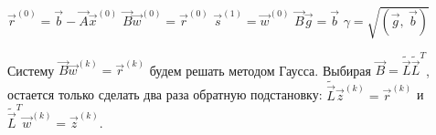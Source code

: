 \begin{algorithm*}[H]
    \DontPrintSemicolon

    $\vec{r}^{(0)} = \vec{b} - \vec{A} \vec{x}^{(0)}$\;
    $\vec{B} \vec{w}^{(0)} = \vec{r}^{(0)}$\;
    $\vec{s}^{(1)} = \vec{w}^{(0)}$\;
    $\vec{B} \vec{g} = \vec{b}$\;
    $\gamma = \sqrt{\left( \vec{g},\ \vec{b} \right)}$\;

\end{algorithm*}
\noindent Систему $\vec{B} \vec{w}^{(k)} = \vec{r}^{(k)}$ будем решать методом Гаусса. Выбирая $\vec{B} = \widetilde{\vec{L}}\widetilde{\vec{L}}^T$, остается только сделать два раза обратную
подстановку: $\widetilde{\vec{L}} \vec{z}^{(k)} = \vec{r}^{(k)}$ и $\widetilde{\vec{L}}^T \vec{w}^{(k)} = \vec{z}^{(k)}$.

